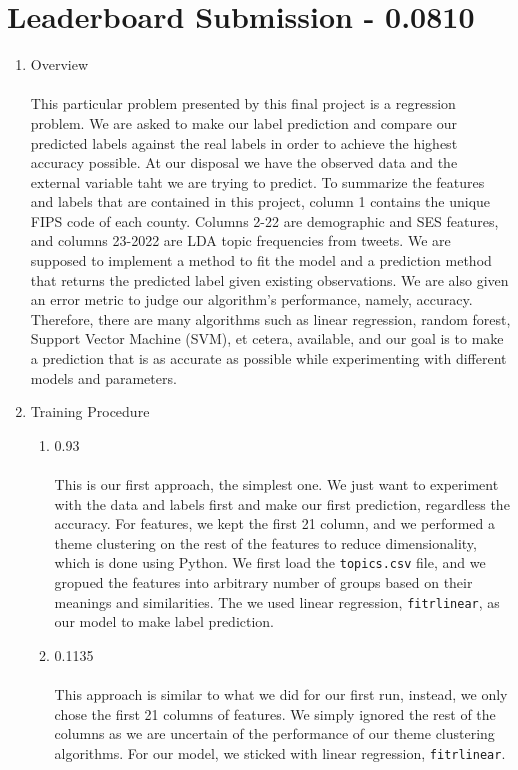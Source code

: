 \documentclass[english]{article}
\begin{document}
\section{Leaderboard Submission - 0.0810}
\begin{enumerate}
\item Overview\\\\
This particular problem presented by this final project is a regression problem. We are asked to make our label prediction and compare our predicted labels against the real labels in order to achieve the highest accuracy possible. At our disposal we have the observed data and the external variable taht we are trying to predict. To summarize the features and labels that are contained in this project, column 1 contains the unique FIPS code of each county. Columns 2-22 are demographic and SES features, and columns 23-2022 are LDA topic frequencies from tweets. We are supposed to implement a method to fit the model and a prediction method that returns the predicted label given existing observations. We are also given an error metric to judge our algorithm's performance, namely, accuracy. Therefore, there are many algorithms such as linear regression, random forest, Support Vector Machine (SVM), et cetera, available, and our goal is to make a prediction that is as accurate as possible while experimenting with different models and parameters.
\item Training Procedure
  \begin{enumerate}
      \item 0.93\\\\
      This is our first approach, the simplest one. We just want to experiment with the data and labels first and make our first prediction, regardless the accuracy. For features, we kept the first 21 column, and we performed a theme clustering on the rest of the features to reduce dimensionality, which is done using Python. We first load the \texttt{topics.csv} file, and we gropued the features into arbitrary number of groups based on their meanings and similarities. The we used linear regression, \texttt{fitrlinear}, as our model to make label prediction.
      \item 0.1135\\\\
      This approach is similar to what we did for our first run, instead, we only chose the first 21 columns of features. We simply ignored the rest of the columns as we are uncertain of the performance of our theme clustering algorithms. For our model, we sticked with linear regression, \texttt{fitrlinear}.

\end{enumerate}
\end{enumerate}
\end{document}
